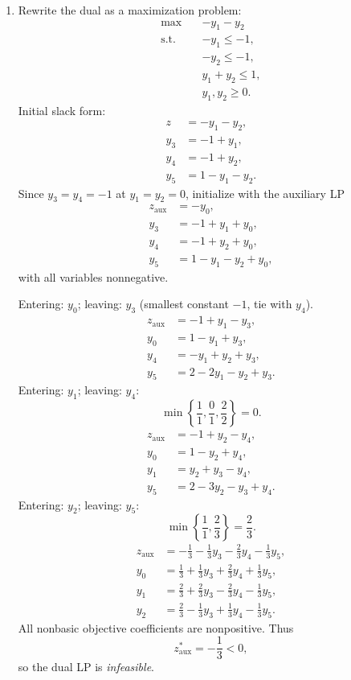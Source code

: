 \documentclass{Group_Templ}
\begin{document}
\begin{enumerate}
		\item Rewrite the dual as a maximization problem:
		\begin{align*}
			\max\quad &-y_1-y_2\\
			\text{s.t.}\quad &-y_1\le -1,\\
			&-y_2\le -1,\\
			&y_1+y_2\le 1,\\
			&y_1,y_2\ge 0.
		\end{align*}
		Initial slack form:
		\begin{align*}
			z&=-y_1-y_2,\\
			y_3&=-1+y_1,\\
			y_4&=-1+y_2,\\
			y_5&=1-y_1-y_2.
		\end{align*}
		Since $y_3=y_4=-1$ at $y_1=y_2=0$, initialize with the auxiliary LP
		\begin{align*}
			z_{\mathrm{aux}}&=-y_0,\\
			y_3&=-1+y_1+y_0,\\
			y_4&=-1+y_2+y_0,\\
			y_5&=1-y_1-y_2+y_0,
		\end{align*}
		with all variables nonnegative.
		
		Entering: $y_0$; leaving: $y_3$ (smallest constant $-1$, tie with $y_4$).
		\begin{align*}
			z_{\mathrm{aux}}&=-1+y_1-y_3,\\
			y_0&=1-y_1+y_3,\\
			y_4&=-y_1+y_2+y_3,\\
			y_5&=2-2y_1-y_2+y_3.
		\end{align*}
		Entering: $y_1$; leaving: $y_4$:
		\[
		\min\left\{\frac11,\frac01,\frac22\right\}=0.
		\]
		\begin{align*}
			z_{\mathrm{aux}}&=-1+y_2-y_4,\\
			y_0&=1-y_2+y_4,\\
			y_1&=y_2+y_3-y_4,\\
			y_5&=2-3y_2-y_3+y_4.
		\end{align*}
		Entering: $y_2$; leaving: $y_5$:
		\[
		\min\left\{\frac11,\frac23\right\}=\frac23.
		\]
		\begin{align*}
			z_{\mathrm{aux}}&=-\frac13-\frac13y_3-\frac23y_4-\frac13y_5,\\
			y_0&=\frac13+\frac13y_3+\frac23y_4+\frac13y_5,\\
			y_1&=\frac23+\frac23y_3-\frac23y_4-\frac13y_5,\\
			y_2&=\frac23-\frac13y_3+\frac13y_4-\frac13y_5.
		\end{align*}
		All nonbasic objective coefficients are nonpositive. Thus
		\[
		\boxed{z_{\mathrm{aux}}^*=-\frac13<0},
		\]
		so the dual LP is \emph{infeasible}.
	\end{enumerate}
	
\end{document}
